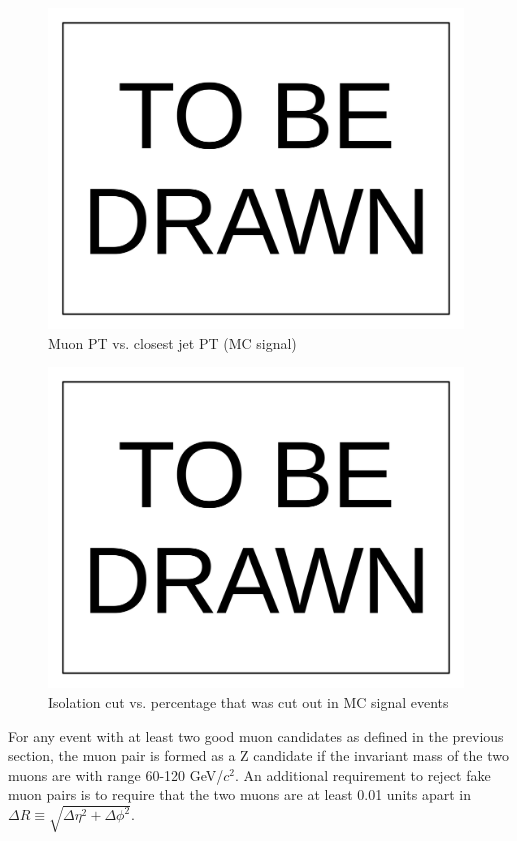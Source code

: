 \documentclass[10pt,a4paper,onecolumn]{article}
\begin{document}
\begin{figure}
\includegraphics[width=110mm]{ToBeDrawn.pdf}
\caption{Muon PT vs. closest jet PT (MC signal)}
\label{Figure_CandidateMuonVsClosestJetPT}
\end{figure}

\begin{figure}
\includegraphics[width=110mm]{ToBeDrawn.pdf}
\caption{Isolation cut vs. percentage that was cut out in MC signal events}
\label{Figure_IsolationCutVsRejectionPercentage}
\end{figure}

For any event with at least two good muon candidates as defined in the previous section, the muon pair is formed as a Z candidate if
the invariant mass of the two muons are with range 60-120 GeV/$c^2$.  An additional requirement to reject fake muon pairs is to require
that the two muons are at least 0.01 units apart in $\Delta R \equiv \sqrt{\Delta\eta^2 + \Delta\phi^2}$.
\end{document}
